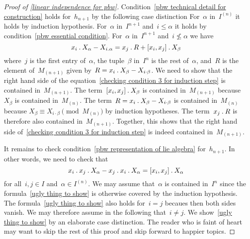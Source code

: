 \begin{proof}[Proof of \cref{linear independence for pbw}]
	Condition~\ref{pbw technical detail for construction} holds for~$h_{n+1}$ by the following case distinction
	For~$\alpha$ in~$I^{(n)}$ it holds by induction hypothesis.
	For~$\alpha$ in~$I^{n+1}$ and~$i \leq \alpha$ it holds by condition~\ref{pbw essential condition}.
	For~$\alpha$ in~$I^{n+1}$ and~$i \nleq \alpha$ we have
	\begin{equation}
		\label{checking condition 3 for induction step}
		x_i \mathbin{.} X_\alpha - X_{i.\alpha}
		=
		x_j \mathbin{.} R + [x_i, x_j] \mathbin{.} X_\beta
	\end{equation}
	where~$j$ is the first entry of~$\alpha$, the tuple~$\beta$ in~$I^n$ is the rest of~$\alpha$, and~$R$ is the element of~$M_{(n+1)}$ given by~$R = x_i \mathbin{.} X_\beta - X_{i \cdot \beta}$.
	We need to show that the right hand side of the equation~\eqref{checking condition 3 for induction step} is contained in~$M_{(n+1)}$.
	The term~$[x_i, x_j] \mathbin{.} X_\beta$ is contained in~$M_{(n+1)}$ because~$X_\beta$ is contained in~$M_{(n)}$.
	The term~$R = x_i \mathbin{.} X_\beta - X_{i \cdot \beta}$ is contained in~$M_{(n)}$ because $X_\beta \equiv X_{i \cdot \beta} \pmod{M_{(n)}}$ by induction hypotheses.
	The term~$x_j \mathbin{.} R$ is therefore also contained in~$M_{(n+1)}$.
	Together, this shows that the right hand side of~\eqref{checking condition 3 for induction step} is indeed contained in~$M_{(n+1)}$.

	It remains to check condition~\ref{pbw representation of lie algebra} for~$h_{n+1}$.
	In other words, we need to check that
	\begin{equation}
		\label{ugly thing to show}
		x_i \mathbin{.} x_j \mathbin{.} X_\alpha - x_j \mathbin{.} x_i \mathbin{.} X_\alpha
		=
		[x_i, x_j] \mathbin{.} X_\alpha
	\end{equation}
	for all~$i, j \in I$ and~$\alpha \in I^{(n)}$.
	We may assume that~$\alpha$ is contained in~$I^n$ since the formula~\eqref{ugly thing to show} is otherwise covered by the induction hypothesis.
	The formula~\eqref{ugly thing to show} also holds for~$i = j$ becaues then both sides vanish.
	We may therefore assume in the following that~$i \neq j$.
	We show~\eqref{ugly thing to show} by an elaborate case distinction.
	The reader who is faint of heart may want to skip the rest of this proof and skip forward to happier topics.
	

\end{proof}
